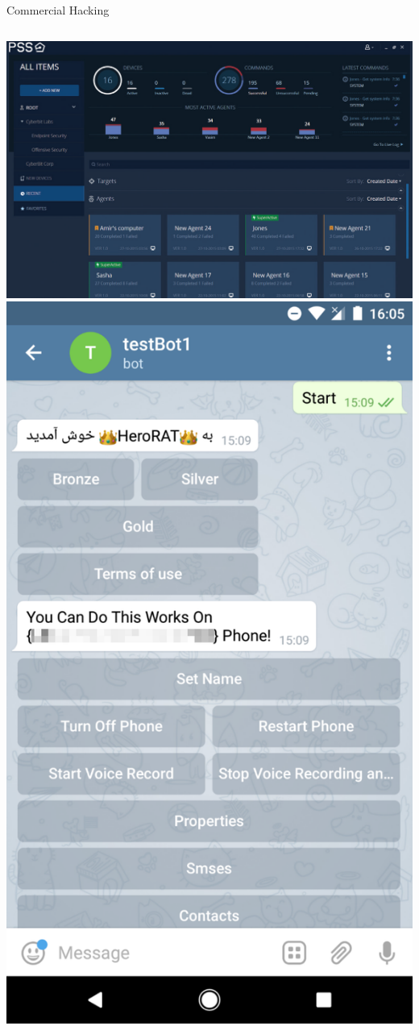 \documentclass[nobackground,dvipsnames,table]{beamer}
\begin{document}
\begin{frame}{Commercial Hacking}
    \begin{columns}
            \includegraphics[width=\textwidth]{pss-commercial-hacking}
            \includegraphics[width=\textwidth]{testbot1}

\end{columns}
\end{frame}
\end{document}
